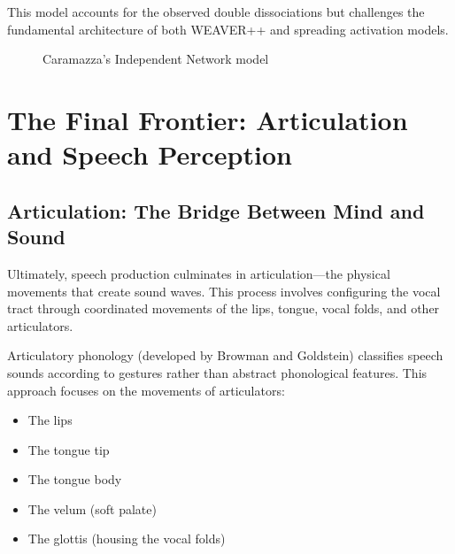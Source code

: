 \documentclass[12pt,a4paper]{article}
\begin{document}
This model accounts for the observed double dissociations but challenges the fundamental architecture of both WEAVER++ and spreading activation models.

\begin{figure}[h]
\centering
{}
\caption{Caramazza's Independent Network model}
\label{fig:independent_network}
\end{figure}

\section{The Final Frontier: Articulation and Speech Perception}

\subsection{Articulation: The Bridge Between Mind and Sound}

Ultimately, speech production culminates in articulation—the physical movements that create sound waves. This process involves configuring the vocal tract through coordinated movements of the lips, tongue, vocal folds, and other articulators.

Articulatory phonology (developed by Browman and Goldstein) classifies speech sounds according to gestures rather than abstract phonological features. This approach focuses on the movements of articulators:

\begin{itemize}
\item The lips
\item The tongue tip
\item The tongue body
\item The velum (soft palate)
\item The glottis (housing the vocal folds)
\end{itemize}
\end{document}
